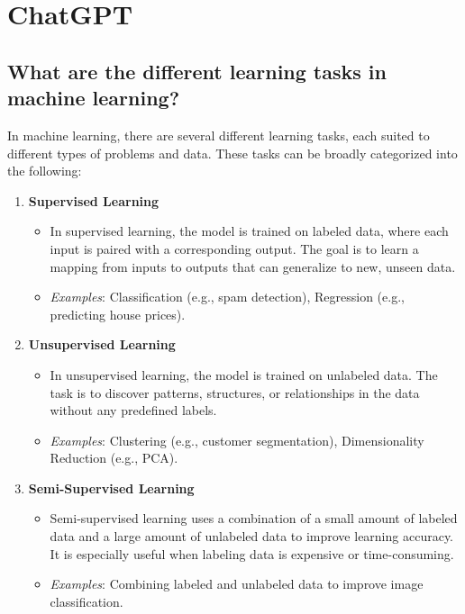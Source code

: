 \section{ChatGPT}

\subsection{What are the different learning tasks in machine learning?}
In machine learning, there are several different learning tasks, each suited to different types of problems and data. These tasks can be broadly categorized into the following:

\begin{enumerate}
    \item \textbf{Supervised Learning}
    \begin{itemize}
        \item In supervised learning, the model is trained on labeled data, where each input is paired with a corresponding output. The goal is to learn a mapping from inputs to outputs that can generalize to new, unseen data.
        \item \textit{Examples}: Classification (e.g., spam detection), Regression (e.g., predicting house prices).
    \end{itemize}

    \item \textbf{Unsupervised Learning}
    \begin{itemize}
        \item In unsupervised learning, the model is trained on unlabeled data. The task is to discover patterns, structures, or relationships in the data without any predefined labels.
        \item \textit{Examples}: Clustering (e.g., customer segmentation), Dimensionality Reduction (e.g., PCA).
    \end{itemize}

    \item \textbf{Semi-Supervised Learning}
    \begin{itemize}
        \item Semi-supervised learning uses a combination of a small amount of labeled data and a large amount of unlabeled data to improve learning accuracy. It is especially useful when labeling data is expensive or time-consuming.
        \item \textit{Examples}: Combining labeled and unlabeled data to improve image classification.
    \end{itemize}


\end{enumerate}
